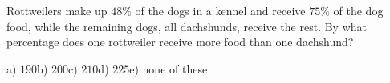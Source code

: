 Rottweilers make up $48\%$ of the dogs in a kennel and receive $75\%$ of the dog food, while the remaining dogs, all dachshunds, receive the rest. By what percentage does one rottweiler receive more food than one dachshund?

a) $190$\quad b) $200$\quad c) $210$\quad d) $225$\quad e) none of these
